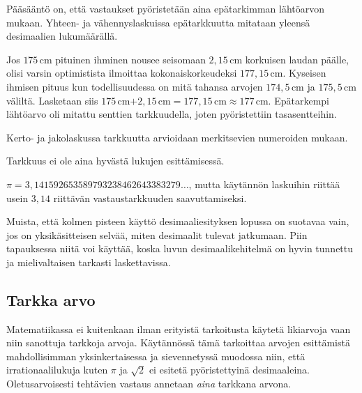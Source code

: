 Pääsääntö on, että vastaukset pyöristetään aina epätarkimman lähtöarvon mukaan. Yhteen- ja vähennyslaskuissa epätarkkuutta mitataan yleensä desimaalien lukumäärällä.

\begin{esimerkki} Jos $175$\,cm pituinen ihminen nousee seisomaan $2,15$\,cm korkuisen laudan päälle, olisi varsin optimistista ilmoittaa kokonaiskorkeudeksi $177,15$\,cm. Kyseisen ihmisen pituus kun todellisuudessa on mitä tahansa arvojen $174,5$\,cm ja $175,5$\,cm väliltä. Lasketaan siis $175$\,cm$+2,15$\,cm$=177,15$\,cm$\approx 177$\,cm. 
Epätarkempi lähtöarvo oli mitattu senttien tarkkuudella, joten pyöristettiin tasasentteihin.
\end{esimerkki}

Kerto- ja jakolaskussa tarkkuutta arvioidaan merkitsevien numeroiden mukaan.


Tarkkuus ei ole aina hyvästä lukujen esittämisessä.

\begin{esimerkki}
$\pi = 3,141592653589793238462643383279 \ldots$, mutta käytännön laskuihin riittää usein $3,14$ riittävän vastaustarkkuuden saavuttamiseksi.
\end{esimerkki}

Muista, että kolmen pisteen käyttö desimaaliesityksen lopussa on suotavaa vain, jos on yksikäsitteisen selvää, miten desimaalit tulevat jatkumaan. Piin tapauksessa niitä voi käyttää, koska luvun desimaalikehitelmä on hyvin tunnettu ja mielivaltaisen tarkasti laskettavissa.

\subsection{Tarkka arvo}

Matematiikassa ei kuitenkaan ilman erityistä tarkoitusta käytetä likiarvoja vaan niin sanottuja tarkkoja arvoja. Käytännössä tämä tarkoittaa arvojen esittämistä mahdollisimman yksinkertaisessa ja sievennetyssä muodossa niin, että irrationaalilukuja kuten $\pi$ ja $\sqrt{2}$ ei esitetä pyöristettyinä desimaaleina. Oletusarvoisesti tehtävien vastaus annetaan \textit{aina} tarkkana arvona.

